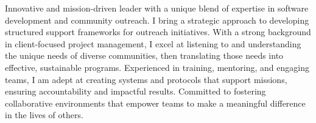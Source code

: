 

\begin{cvparagraph}

Innovative and mission-driven leader with a unique blend of expertise in software development and community outreach. I bring a strategic approach to developing structured support frameworks for outreach initiatives. With a strong background in client-focused project management, I excel at listening to and understanding the unique needs of diverse communities, then translating those needs into effective, sustainable programs. Experienced in training, mentoring, and engaging teams, I am adept at creating systems and protocols that support missions, ensuring accountability and impactful results. Committed to fostering collaborative environments that empower teams to make a meaningful difference in the lives of others.



\end{cvparagraph}
